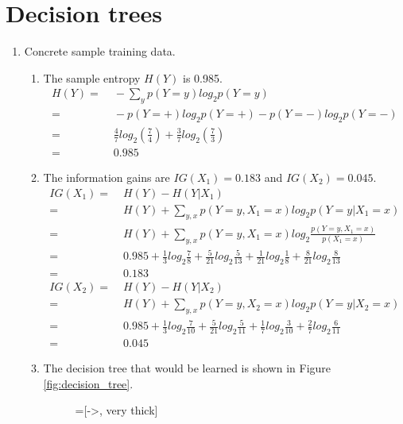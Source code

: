 \section{Decision trees}

\begin{enumerate}
\item Concrete sample training data.
\begin{enumerate}
\item The sample entropy $H(Y)$ is 0.985. \begin{align*}
H(Y)= & \;-\sum_{y}p(Y=y)log_{2}p(Y=y)\\
= & \;-p(Y=+)log_{2}p(Y=+)-p(Y=-)log_{2}p(Y=-)\\
= & \;\frac{4}{7}log_{2}(\frac{7}{4})+\frac{3}{7}log_{2}(\frac{7}{3})\\
= & \;0.985\end{align*}

\item The information gains are $IG(X_{1})=0.183$ and $IG(X_{2})=0.045$.
\begin{align*}
IG(X_{1})= & \; H(Y)-H(Y|X_{1})\\
= & \; H(Y)+\sum_{y,x}p(Y=y,X_{1}=x)log_{2}p(Y=y|X_{1}=x)\\
= & \; H(Y)+\sum_{y,x}p(Y=y,X_{1}=x)log_{2}\frac{p(Y=y,X_{1}=x)}{p(X_{1}=x)}\\
= & \;0.985+\frac{1}{3}log_{2}\frac{7}{8}+\frac{5}{21}log_{2}\frac{5}{13}+\frac{1}{21}log_{2}\frac{1}{8}+\frac{8}{21}log_{2}\frac{8}{13}\\
= & \;0.183\\
IG(X_{2})= & \; H(Y)-H(Y|X_{2})\\
= & \; H(Y)+\sum_{y,x}p(Y=y,X_{2}=x)log_{2}p(Y=y|X_{2}=x)\\
= & \;0.985+\frac{1}{3}log_{2}\frac{7}{10}+\frac{5}{21}log_{2}\frac{5}{11}+\frac{1}{7}log_{2}\frac{3}{10}+\frac{2}{7}log_{2}\frac{6}{11}\\
= & \;0.045\end{align*}


  \item The decision tree that would be learned is shown in Figure
    \ref{fig:decision_tree}.
    \begin{figure}[H]
      \centering
      =[->, very thick]
\end{figure}
\end{enumerate}
\end{enumerate}
